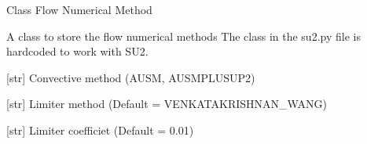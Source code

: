 \documentclass[letterpaper,10pt,english]{sphinxmanual}
\begin{document}
\begin{fulllineitems}
\label{\detokenize{modules:su2.Flow_Numerical_Method}}
\pysigstartsignatures
{}
\pysigstopsignatures
\sphinxAtStartPar
Class Flow Numerical Method

\sphinxAtStartPar
A class to store the flow numerical methods
The class in the su2.py file is hardcoded to work with SU2.

\begin{fulllineitems}
\label{\detokenize{modules:su2.Flow_Numerical_Method.conv_method}}
\pysigstartsignatures
{}
\pysigstopsignatures
\sphinxAtStartPar
{[}str{]} Convective method (AUSM, AUSMPLUSUP2)

\end{fulllineitems}


\begin{fulllineitems}
\label{\detokenize{modules:su2.Flow_Numerical_Method.limiter}}
\pysigstartsignatures
{}
\pysigstopsignatures
\sphinxAtStartPar
{[}str{]} Limiter method (Default = VENKATAKRISHNAN\_WANG)

\end{fulllineitems}


\begin{fulllineitems}
\label{\detokenize{modules:su2.Flow_Numerical_Method.limiter_coeff}}
\pysigstartsignatures
{}
\pysigstopsignatures
\sphinxAtStartPar
{[}str{]} Limiter coefficiet (Default = 0.01)

\end{fulllineitems}



\end{fulllineitems}
\end{document}
